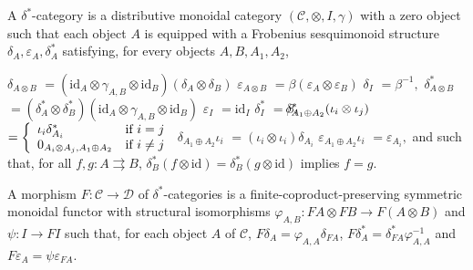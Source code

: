 \documentclass[10pt,a4paper]{amsart}
\begin{document}
 
A $\delta^{\ast}$-category is a distributive monoidal category $(\mathcal{C},\otimes,I,\gamma)$ with a zero object such that each object $A$ is equipped with a Frobenius sesquimonoid structure $\delta_{A},\varepsilon_{A},\delta_{A}^{\ast}$ satisfying, for every objects $A,B,A_{1},A_{2}$,\par
    $\displaystyle\delta_{A\otimes B}$ $\displaystyle=(\mathrm{id}_{A}\otimes\gamma_{A,B}\otimes\mathrm{id}_{B})(%
\delta_{A}\otimes\delta_{B})$ $\displaystyle\varepsilon_{A\otimes B}$ $\displaystyle=\beta(\varepsilon_{A}\otimes\varepsilon_{B})$ $\displaystyle\delta_{I}$ $\displaystyle=\beta^{-1},$     $\displaystyle\delta^{\ast}_{A\otimes B}$ $\displaystyle=(\delta^{\ast}_{A}\otimes\delta^{\ast}_{B})(\mathrm{id}_{A}%
\otimes\gamma_{A,B}\otimes\mathrm{id}_{B})$ $\displaystyle\varepsilon_{I}$ $\displaystyle=\mathrm{id}_{I}$ $\displaystyle\delta^{\ast}_{I}$ $\displaystyle=\beta,$     $\displaystyle\hskip-15.0pt\delta^{\ast}_{A_{1}\oplus A_{2}}(\iota_{i}\otimes%
\iota_{j})$ $\displaystyle=\left\{\begin{array}[]{ll}\iota_{i}\delta^{\ast}_{A_{i}}&\text{%
if }i=j\\
0_{A_{i}\otimes A_{j},A_{1}\oplus A_{2}}&\text{if }i\neq j\end{array}\right.$ $\displaystyle\delta_{A_{1}\oplus A_{2}}\iota_{i}$ $\displaystyle=(\iota_{i}\otimes\iota_{i})\delta_{A_{i}}$ $\displaystyle\varepsilon_{A_{1}\oplus A_{2}}\iota_{i}$ $\displaystyle=\varepsilon_{A_{i}},$    
and such that, for all $f,g:A\rightrightarrows B$, $\delta^{\ast}_{B}(f\otimes\mathrm{id})=\delta^{\ast}_{B}(g\otimes\mathrm{id})$ implies $f=g$.\par
 
 
 
A morphism $F:\mathcal{C}\to\mathcal{D}$ of $\delta^{\ast}$-categories is a finite-coproduct-preserving symmetric monoidal functor with structural isomorphisms $\varphi_{A,B}:FA\otimes FB\to F(A\otimes B)$ and $\psi:I\to FI$ such that, for each object $A$ of $\mathcal{C}$, $F\delta_{A}=\varphi_{A,A}\delta_{FA}$, $F\delta^{\ast}_{A}=\delta^{\ast}_{FA}\varphi^{-1}_{A,A}$ and $F\varepsilon_{A}=\psi\varepsilon_{FA}$.\par
 
 
 
 
\end{document}

